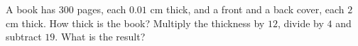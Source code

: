 A book has $300$ pages, each $0.01$ cm thick, and a front and a back cover, each $2$ cm thick. How thick is the book? Multiply the thickness by $12$, divide by $4$ and subtract $19$. What is the result?
